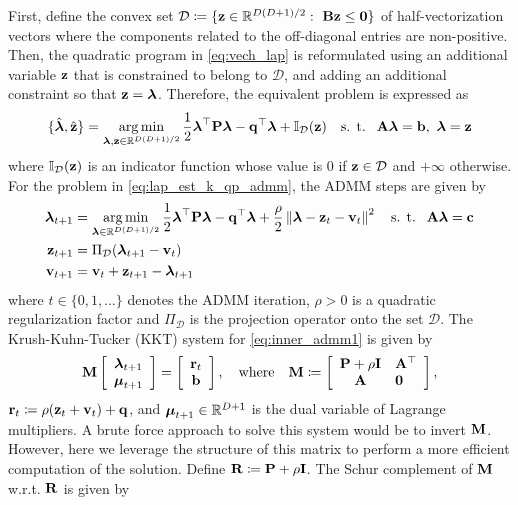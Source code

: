 First, define the convex set $\mathcal{D} \coloneqq \{\mathbf{z}\in\mathbb{R}^{D(D+1)/2}:\ \mathbf{B}\mathbf{z}\leq \mathbf{0}\}$ of half-vectorization vectors where the components related to the off-diagonal entries are non-positive. Then, the quadratic program in \eqref{eq:vech_lap} is reformulated using an additional variable $\mathbf{z}$ that is constrained to belong to $\mathcal{D}$, and adding an additional constraint so that $\mathbf{z}=\boldsymbol{\lambda}$. Therefore, the equivalent problem is expressed as
\begin{equation}
	\label{eq:lap_est_k_qp_admm} 
	\{\hat{\boldsymbol{\lambda}},\hat{\mathbf{z}}\} =\operatorname*{arg\,min}_{\boldsymbol{\lambda},\mathbf{z}\in\mathbb{R}^{D(D+1)/2}} \frac{1}{2}\boldsymbol{\lambda}^\top\mathbf{P}\boldsymbol{\lambda} - \mathbf{q}^\top\boldsymbol{\lambda} + \mathbb{I}_{\mathcal{D}}(\mathbf{z}) 
	\quad\text{s. t. }\ \mathbf{A}\boldsymbol{\lambda} = \mathbf{b},\ \boldsymbol{\lambda} = \mathbf{z}
\end{equation}
where $\mathbb{I}_{\mathcal{D}}(\mathbf{z})$ is an indicator function whose value is 0 if $\mathbf{z}\in\mathcal{D}$ and $+\infty$ otherwise. For the problem in \eqref{eq:lap_est_k_qp_admm}, the ADMM steps are given by
\begin{align}
	\boldsymbol{\lambda}_{t+1} &= \operatorname*{arg\,min}_{\boldsymbol{\lambda}\in\mathbb{R}^{D(D+1)/2}} \frac{1}{2}\boldsymbol{\lambda}^\top\mathbf{P}\boldsymbol{\lambda} - \mathbf{q}^\top\boldsymbol{\lambda} + \frac{\rho}{2}\left\|\boldsymbol{\lambda}-\mathbf{z}_t-\mathbf{v}_t\right\|^2\quad \text{s. t. }\ \mathbf{A}\boldsymbol{\lambda} = \mathbf{c} \label{eq:inner_admm1} \\
	\mathbf{z}_{t+1} &= \Pi_{\mathcal{D}}(\boldsymbol{\lambda}_{t+1}-\mathbf{v}_t) \label{eq:inner_admm2} \\
	\mathbf{v}_{t+1} &= \mathbf{v}_t + \mathbf{z}_{t+1} - \boldsymbol{\lambda}_{t+1} \label{eq:inner_admm3}
\end{align}
where $t\in\{0,1,\ldots\}$ denotes the ADMM iteration, $\rho>0$ is a quadratic regularization factor and $\Pi_{\mathcal{D}}$ is the projection operator onto the set $\mathcal{D}$. The Krush-Kuhn-Tucker (KKT) system for \eqref{eq:inner_admm1} is given by
\begin{equation}\label{eq:kkt_system_admm1}
	\mathbf{M}
	\left[
	\begin{array}{c}
		\boldsymbol{\lambda}_{t+1} \\
		\boldsymbol{\mu}_{t+1}
	\end{array}
	\right] = 
	\left[
	\begin{array}{c}
		\mathbf{r}_t \\
		\mathbf{b}
	\end{array}
	\right],\quad \text{where}\quad \mathbf{M}\coloneqq \left[
	\begin{array}{cll}
		\mathbf{P} + \rho\mathbf{I} & \mathbf{A}^\top \\
		\mathbf{A} & \mathbf{0}
	\end{array}
	\right],
\end{equation}
$\mathbf{r}_t\coloneqq \rho(\mathbf{z}_t+\mathbf{v}_t) + \mathbf{q}$, and
$\boldsymbol{\mu}_{t+1}\in\mathbb{R}^{D+1}$ is the dual variable of Lagrange multipliers. A brute force approach to solve this system would be to invert $\mathbf{M}$. However, here we leverage the structure of this matrix to perform a more efficient computation of the solution. Define $\mathbf{R}\coloneqq\mathbf{P}+\rho\mathbf{I}$. The Schur complement of $\mathbf{M}$ w.r.t. $\mathbf{R}$ is given by
